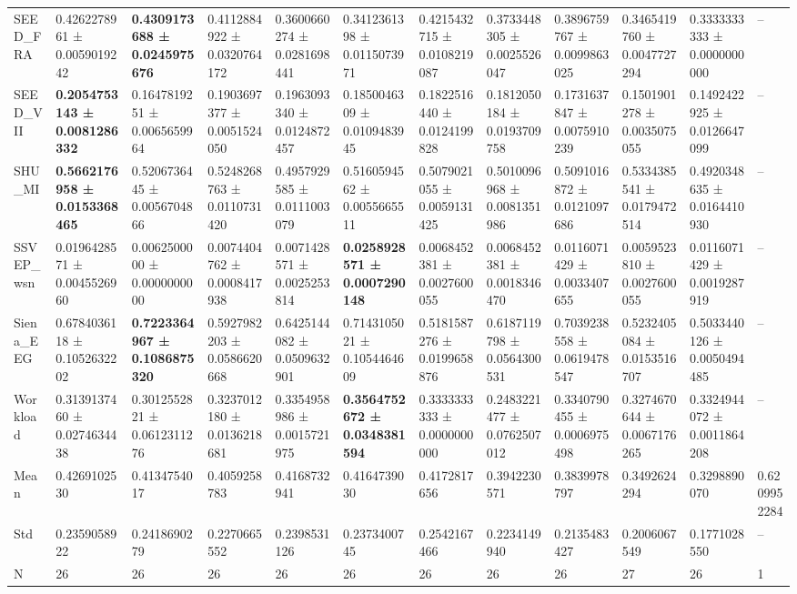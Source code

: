 \begin{table}[htbp]
\begin{tabular}{llllllllllll}
SEED_FRA & 0.4262278961 ± 0.0059019242 & \bfseries 0.4309173688 ± 0.0245975676 & 0.4112884922 ± 0.0320764172 & 0.3600660274 ± 0.0281698441 & 0.3412361398 ± 0.0115073971 & 0.4215432715 ± 0.0108219087 & 0.3733448305 ± 0.0025526047 & 0.3896759767 ± 0.0099863025 & 0.3465419760 ± 0.0047727294 & 0.3333333333 ± 0.0000000000 & -- \\
SEED_VII & \bfseries 0.2054753143 ± 0.0081286332 & 0.1647819251 ± 0.0065659964 & 0.1903697377 ± 0.0051524050 & 0.1963093340 ± 0.0124872457 & 0.1850046309 ± 0.0109483945 & 0.1822516440 ± 0.0124199828 & 0.1812050184 ± 0.0193709758 & 0.1731637847 ± 0.0075910239 & 0.1501901278 ± 0.0035075055 & 0.1492422925 ± 0.0126647099 & -- \\
SHU_MI & \bfseries 0.5662176958 ± 0.0153368465 & 0.5206736445 ± 0.0056704866 & 0.5248268763 ± 0.0110731420 & 0.4957929585 ± 0.0111003079 & 0.5160594562 ± 0.0055665511 & 0.5079021055 ± 0.0059131425 & 0.5010096968 ± 0.0081351986 & 0.5091016872 ± 0.0121097686 & 0.5334385541 ± 0.0179472514 & 0.4920348635 ± 0.0164410930 & -- \\
SSVEP_wsn & 0.0196428571 ± 0.0045526960 & 0.0062500000 ± 0.0000000000 & 0.0074404762 ± 0.0008417938 & 0.0071428571 ± 0.0025253814 & \bfseries 0.0258928571 ± 0.0007290148 & 0.0068452381 ± 0.0027600055 & 0.0068452381 ± 0.0018346470 & 0.0116071429 ± 0.0033407655 & 0.0059523810 ± 0.0027600055 & 0.0116071429 ± 0.0019287919 & -- \\
Siena_EEG & 0.6784036118 ± 0.1052632202 & \bfseries 0.7223364967 ± 0.1086875320 & 0.5927982203 ± 0.0586620668 & 0.6425144082 ± 0.0509632901 & 0.7143105021 ± 0.1054464609 & 0.5181587276 ± 0.0199658876 & 0.6187119798 ± 0.0564300531 & 0.7039238558 ± 0.0619478547 & 0.5232405084 ± 0.0153516707 & 0.5033440126 ± 0.0050494485 & -- \\
Workload & 0.3139137460 ± 0.0274634438 & 0.3012552821 ± 0.0612311276 & 0.3237012180 ± 0.0136218681 & 0.3354958986 ± 0.0015721975 & \bfseries 0.3564752672 ± 0.0348381594 & 0.3333333333 ± 0.0000000000 & 0.2483221477 ± 0.0762507012 & 0.3340790455 ± 0.0006975498 & 0.3274670644 ± 0.0067176265 & 0.3324944072 ± 0.0011864208 & -- \\
Mean & 0.4269102530 & 0.4134754017 & 0.4059258783 & 0.4168732941 & 0.4164739030 & 0.4172817656 & 0.3942230571 & 0.3839978797 & 0.3492624294 & 0.3298890070 & 0.6209952284 \\
Std & 0.2359058922 & 0.2418690279 & 0.2270665552 & 0.2398531126 & 0.2373400745 & 0.2542167466 & 0.2234149940 & 0.2135483427 & 0.2006067549 & 0.1771028550 & -- \\
N & 26 & 26 & 26 & 26 & 26 & 26 & 26 & 26 & 27 & 26 & 1 \\
\bottomrule
\end{tabular}
\end{table}

